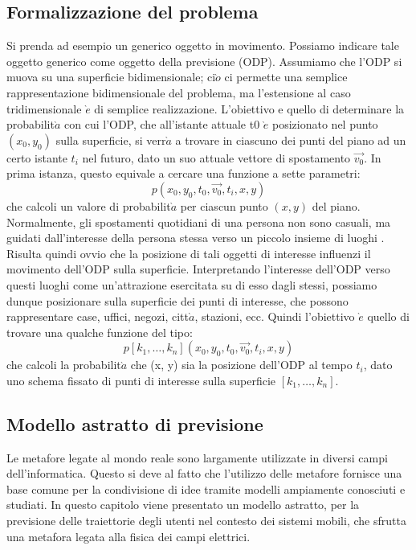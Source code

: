 \subsection{Formalizzazione del problema}
Si prenda ad esempio un generico oggetto in movimento. Possiamo indicare
tale oggetto generico come oggetto della previsione (ODP). Assumiamo che
l'ODP si muova su una superficie bidimensionale; ci$\grave{o}$ ci permette una semplice
rappresentazione bidimensionale del problema, ma l'estensione al caso tridimensionale
$\grave{e}$ di semplice realizzazione. L'obiettivo e quello di determinare la
probabilit$\grave{a}$ con cui l'ODP, che all'istante attuale t0 $\grave{e}$ posizionato nel punto
$(x_{0}, y_{0})$ sulla superficie, si verr$\grave{a}$ a trovare in ciascuno dei punti del piano ad
un certo istante $t_{i}$ nel futuro, dato un suo attuale vettore di spostamento
$\vec{v_{0}}$.
In prima istanza, questo equivale a cercare una funzione a sette parametri:
\begin{equation}
p(x_{0},y_{0},t_{0},\vec{v_{0}},t_{i},x,y)
\end{equation}
che calcoli un valore di probabilit$\grave{a}$ per ciascun punto $(x, y)$ del piano.
Normalmente, gli spostamenti quotidiani di una persona non sono casuali, ma
guidati dall'interesse della persona stessa verso un piccolo insieme di luoghi
\cite{cit_44}. Risulta quindi ovvio che la posizione di tali oggetti di interesse
influenzi il movimento dell'ODP sulla superficie. Interpretando l'interesse dell'ODP
verso questi luoghi come un'attrazione esercitata su di esso dagli stessi, possiamo
dunque posizionare sulla superficie dei punti di interesse, che possono rappresentare
case, uffici, negozi, citt$\grave{a}$, stazioni, ecc. Quindi l'obiettivo $\grave{e}$ quello di
trovare una qualche funzione del tipo:
\begin{equation}
p[k_{1},\dots,k_{n}](x_{0},y_{0},t_{0},\vec{v_{0}},t_{i},x,y)
\end{equation}
che calcoli la probabilit$\grave{a}$ che (x, y) sia la posizione dell'ODP al tempo $t_{i}$,
dato uno schema fissato di punti di interesse sulla superficie $[k_{1},\dots,k_{n}]$.

\subsection{Modello astratto di previsione}
Le metafore legate al mondo reale sono largamente utilizzate in diversi campi
dell'informatica. Questo si deve al fatto che l'utilizzo delle metafore fornisce
una base comune per la condivisione di idee tramite modelli ampiamente
conosciuti e studiati. In questo capitolo viene presentato un modello astratto,
per la previsione delle traiettorie degli utenti nel contesto dei sistemi mobili,
che sfrutta una metafora legata alla fisica dei campi elettrici.

